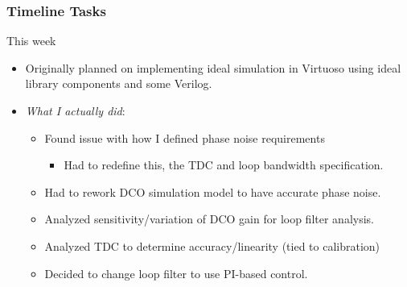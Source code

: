 \documentclass[t, screen, aspectratio=43]{beamer}
\begin{document}
\begin{frame}
	\frametitle{Timeline Tasks}
	\begin{block}{This week}
		\begin{itemize}
			\footnotesize
			\item Originally planned on implementing ideal simulation in Virtuoso using ideal library components and some Verilog.
			\item \textit{What I actually did}:
			\begin{itemize}
				\footnotesize
				\item Found issue with how I defined phase noise requirements
					\begin{itemize}
						\scriptsize
						\item Had to redefine this, the TDC and loop bandwidth specification.
					\end{itemize}
				\item Had to rework DCO simulation model to have accurate phase noise.
				\item Analyzed sensitivity/variation of DCO gain for loop filter analysis.
				\item Analyzed TDC to determine accuracy/linearity (tied to calibration)
				\item Decided to change loop filter to use PI-based control.
			\end{itemize} 
		\end{itemize}    
	\end{block}
\end{frame}

\end{document}

